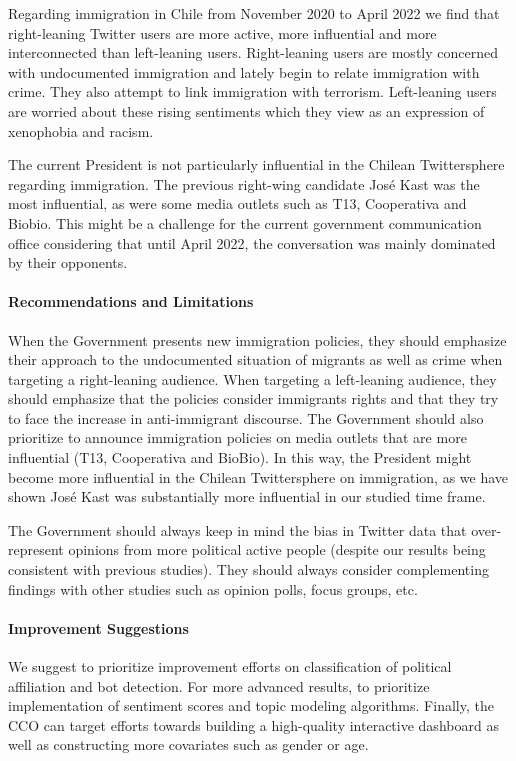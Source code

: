         Regarding immigration in Chile from November 2020 to April 2022 we find that right-leaning Twitter users are more active, more influential and more interconnected than left-leaning users. Right-leaning users are mostly concerned with undocumented immigration and lately begin to relate immigration with crime. They also attempt to link immigration with terrorism. Left-leaning users are worried about these rising sentiments which they view as an expression of xenophobia and racism.
        
        The current President is not particularly influential in the Chilean Twittersphere regarding immigration. The previous right-wing candidate José Kast was the most influential, as were some media outlets such as T13, Cooperativa and Biobio. This might be a challenge for the current government communication office considering that until April 2022, the conversation was mainly dominated by their opponents.
    
    
    \paragraph{Recommendations and Limitations}
        When the Government presents new immigration policies, they should emphasize their approach to the undocumented situation of migrants as well as crime when targeting a right-leaning audience. When targeting a left-leaning audience, they should emphasize that the policies consider immigrants rights and that they try to face the increase in anti-immigrant discourse. The Government should also prioritize to announce immigration policies on media outlets that are more influential (T13, Cooperativa and BioBio). In this way, the President %
        might become more influential in the Chilean Twittersphere on immigration, as we have shown José Kast was substantially more influential in our studied time frame.
        
        The Government should always keep in mind the bias in Twitter data that over-represent opinions from more political active people (despite our results being consistent with previous studies). They should always consider complementing findings with other studies such as opinion polls, focus groups, etc.
    
    
    \paragraph{Improvement Suggestions}
        We suggest to prioritize improvement efforts on classification of political affiliation and bot detection. For more advanced results, to prioritize implementation of sentiment scores and topic modeling algorithms. Finally, the CCO can target efforts towards building a high-quality interactive dashboard as well as constructing more covariates such as gender or age.
        
